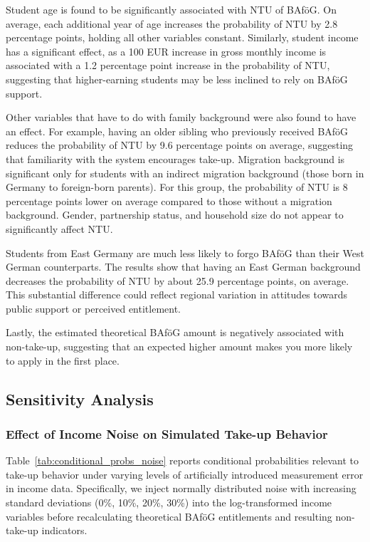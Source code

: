 Student age is found to be significantly associated with NTU of BAföG. 
On average, each additional year of age increases the probability of NTU by 2.8 percentage points, holding all other variables constant. 
Similarly, student income has a significant effect, as a 100 EUR increase in gross monthly income is associated with a 1.2 percentage point increase in the probability of NTU, suggesting that higher-earning students may be less inclined to rely on BAföG support. 


Other variables that have to do with family background were also found to have an effect. 
For example, having an older sibling who previously received BAföG reduces the probability of NTU by 9.6 percentage points on average, suggesting that familiarity with the system encourages take-up. 
Migration background is significant only for students with an indirect migration background (those born in Germany to foreign-born parents). 
For this group, the probability of NTU is 8 percentage points lower on average compared to those without a migration background.  
Gender, partnership status, and household size do not appear to significantly affect NTU.

Students from East Germany are much less likely to forgo BAföG than their West German counterparts. The results show that having an East German background decreases the probability of NTU by about 25.9 percentage points, on average. This substantial difference could reflect regional variation in attitudes towards public support or perceived entitlement.

Lastly, the estimated theoretical BAföG amount is negatively associated with non-take-up, suggesting that an expected higher amount makes you more likely to apply in the first place.


\subsection{Sensitivity Analysis}
\subsubsection{Effect of Income Noise on Simulated Take-up Behavior}
Table~\ref{tab:conditional_probs_noise} reports conditional probabilities relevant to take-up behavior under varying levels of artificially introduced measurement error in income data. 
Specifically, we inject normally distributed noise with increasing standard deviations (0\%, 10\%, 20\%, 30\%) into the log-transformed income variables before recalculating theoretical BAföG entitlements and resulting non-take-up indicators.

